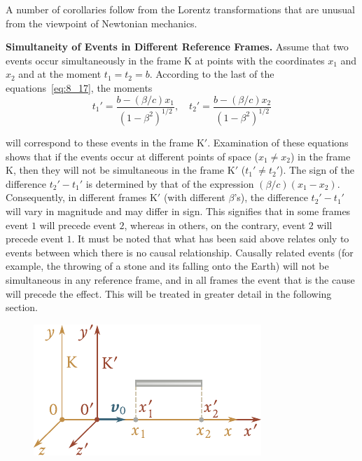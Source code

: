 A number of corollaries follow from the Lorentz transformations that are unusual from the viewpoint of Newtonian mechanics.

\textbf{Simultaneity of Events in Different Reference Frames.} Assume that two events occur simultaneously in the frame K at points with the coordinates $x_1$ and $x_2$ and at the moment $t_1=t_2=b$. According to the last of the equations~\eqref{eq:8_17}, the moments
\begin{equation*}
	t_1' = \frac{b - (\beta/c) x_1}{\left(1 - \beta^2\right)^{1/2}},\quad t_2' = \frac{b - (\beta/c) x_2}{\left(1 - \beta^2\right)^{1/2}}
\end{equation*}

\noindent
will correspond to these events in the frame K$'$. Examination of these equations shows that if the events occur at different points of space ($x_1\neq x_2$) in the frame K, then they will not be simultaneous in the frame K$'$ ($t_1'\neq t_2'$). The sign of the difference $t_2'-t_1'$ is determined by that of the expression $(\beta/c)(x_1-x_2)$. Consequently, in different frames K$'$ (with different $\beta$'s), the difference $t_2'-t_1'$ will vary in magnitude and may differ in sign. This signifies that in some frames event $1$ will precede event $2$, whereas in others, on the contrary, event $2$ will precede event $1$. It must be noted that what has been said above relates only to events between which there is no causal relationship. Causally related events (for example, the throwing of a stone and its falling onto the Earth) will not be simultaneous in any reference frame, and in all frames the event that is the cause will precede the effect. This will be treated in greater detail in the following section.

\begin{figure}[t]
	\begin{center}
		\includegraphics[scale=0.95]{figures/ch_08/fig_8_3.pdf}
		\caption[]{}
		\label{fig:8_3}
	\end{center}
	\vspace{-0.8cm}
\end{figure}


